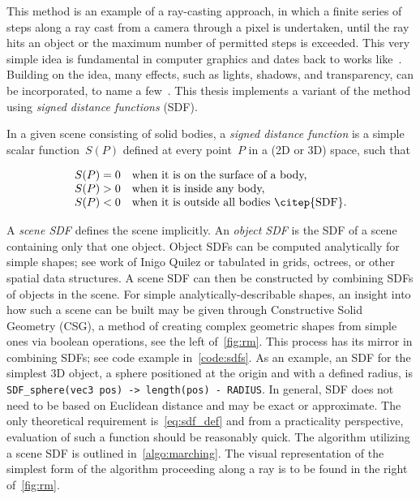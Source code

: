 This method is an example of a ray-casting approach, in which a finite series of steps along
a ray cast from a camera through a pixel is undertaken, until the ray hits an object or
the maximum number of permitted steps is exceeded. This very simple idea is fundamental in
computer graphics and dates back to works like~\citet{RayMarching, Hypertexture}. Building
on the idea, many effects, such as lights, shadows, and transparency, can be incorporated, to
name a few~\citep{RealTimeRendering}. This thesis implements a variant of the method using 
\emph{signed distance functions} (SDF).

In a given scene consisting of solid bodies, a \emph{signed distance function} is a simple scalar
function~$S(P)$ defined at every point~$P$ in a (2D or 3D) space, such that

\begin{equation}\label{eq:sdf_def}
\begin{array}{ll}
S(P) = 0 & \text{when it is on the surface of a body,}\\
S(P) > 0 & \text{when it is inside any body,}\\
S(P) < 0 & \text{when it is outside all bodies~\citep{SDF}.}
\end{array}
\end{equation}

A \emph{scene SDF} defines the scene implicitly. An \emph{object SDF} is the SDF of a scene containing
only that one object. Object SDFs can be computed analytically for simple shapes; see 
work of Inigo Quilez
or tabulated in grids, octrees, or other spatial data structures. A scene SDF can then be constructed
by combining SDFs of objects in the scene. For simple analytically-describable shapes, an
insight into how such a scene can be built may be given through Constructive
Solid Geometry (CSG), a method of creating complex geometric shapes from simple ones via boolean
operations, see the left of~\cref{fig:rm}. This process has its mirror in combining SDFs; see code example in~\cref{code:sdfs}.
As an example, an SDF for the simplest 3D object, a sphere positioned at the origin and with a defined radius,
is \verb|SDF_sphere(vec3 pos) -> length(pos) - RADIUS|. In general, SDF does not need to be based on Euclidean distance
and may be exact or approximate. The only theoretical requirement is~\cref{eq:sdf_def} and from a practicality perspective,
evaluation of such a function should be reasonably quick.
The algorithm utilizing a scene SDF is outlined in~\cref{algo:marching}. The visual representation of
the simplest form of the algorithm proceeding along a ray is to be found in the right of~\cref{fig:rm}.

